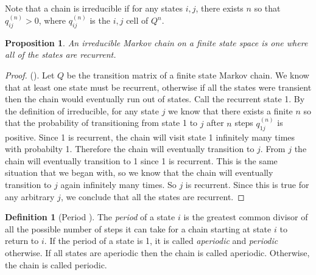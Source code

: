 \documentclass[11pt]{amsart}
\theoremstyle{theorem} %
\newtheorem{prop}[thm]{Proposition}
\theoremstyle{definition}                  %
\newtheorem{defn}[thm]{Definition}
\theoremstyle{example}                       %
\theoremstyle{remark}                       %
\numberwithin{equation}{section}
\begin{document}
Note that a chain is irreducible if for any states $i, j$, there exists $n$ so that $q^{(n)}_{ij}>0$, where $q^{(n)}_{ij}$ is the $i,j$ cell of $Q^n$. 
\begin{prop}
    An irreducible Markov chain on a finite state space is one where all of the states are recurrent.
\end{prop}

\begin{proof}
    (\cite[p.~466]{blitzstein}). Let $Q$ be the transition matrix of a finite state Markov chain. We know that at least one state must be recurrent, otherwise if all the states were transient then the chain would eventually run out of states. Call the recurrent state 1. By the definition of irreducible, for any state $j$ we know that there exists a finite $n$ so that the probability of transitioning from state 1 to $j$ after $n$ steps $q^{(n)}_{1j}$ is positive. Since 1 is recurrent, the chain will visit state 1 infinitely many times with probabilty 1. Therefore the chain will eventually transition to $j$. From $j$ the chain will eventually transition to 1 since 1 is recurrent. This is the same situation that we began with, so we know that the chain will eventually transition to $j$ again infinitely many times. So $j$ is recurrent. Since this is true for any arbitrary $j$, we conclude that all the states are recurrent.
\end{proof}

\begin{defn}[{Period \cite[p.~468]{blitzstein}}]
    The \emph{period} of a state $i$ is the greatest common divisor of all the possible number of steps it can take for a chain starting at state $i$ to return to $i$. If the period of a state is 1, it is called \emph{aperiodic} and \emph{periodic} otherwise. If all states are aperiodic then the chain is called aperiodic. Otherwise, the chain is called periodic.
\end{defn}
\end{document}
